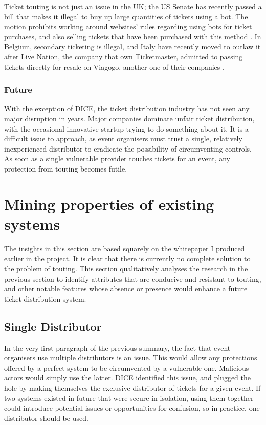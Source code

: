 \documentclass[12pt]{bhamdissertation}
\begin{document}
Ticket touting is not just an issue in the UK; the US Senate has recently passed a bill that makes it illegal to buy up large quantities of tickets using a bot. The motion prohibits working around websites' rules regarding using bots for ticket purchases, and also selling tickets that have been purchased with this method \autocite{M16}. In Belgium, secondary ticketing is illegal, and Italy have recently moved to outlaw it after Live Nation, the company that own Ticketmaster, admitted to passing tickets directly for resale on Viagogo, another one of their companies \autocite{D16}.

\subsection{Future}

With the exception of DICE, the ticket distribution industry has not seen any major disruption in years. Major companies dominate unfair ticket distribution, with the occasional innovative startup trying to do something about it. It is a difficult issue to approach, as event organisers must trust a single, relatively inexperienced distributor to eradicate the possibility of circumventing controls. As soon as a single vulnerable provider touches tickets for an event, any protection from touting becomes futile.
\fi

\chapter{Mining properties of existing systems}

The insights in this section are based squarely on the whitepaper \autocite{B17} I produced earlier in the project. It is clear that there is currently no complete solution to the problem of touting. This section qualitatively analyses the research in the previous section to identify attributes that are conducive and resistant to touting, and other notable features whose absence or presence would enhance a future ticket distribution system.

\section{Single Distributor}

In the very first paragraph of the previous summary, the fact that event organisers use multiple distributors is an issue. This would allow any protections offered by a perfect system to be circumvented by a vulnerable one. Malicious actors would simply use the latter. DICE identified this issue, and plugged the hole by making themselves the exclusive distributor of tickets for a given event. If two systems existed in future that were secure in isolation, using them together could introduce potential issues or opportunities for confusion, so in practice, one distributor should be used.
\end{document}

